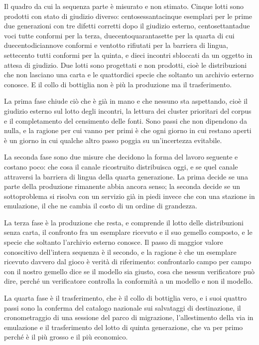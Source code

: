 Il quadro da cui la sequenza parte è misurato e non stimato. Cinque lotti sono prodotti con stato di giudizio diverso: centosessantacinque esemplari per le prime due generazioni con tre difetti corretti dopo il giudizio esterno, centosettantadue voci tutte conformi per la terza, duecentoquarantasette per la quarta di cui duecentodiciannove conformi e ventotto rifiutati per la barriera di lingua, settecento tutti conformi per la quinta, e dieci incontri sbloccati da un oggetto in attesa di giudizio. Due lotti sono progettati e non prodotti, cioè le distribuzioni che non lasciano una carta e le quattordici specie che soltanto un archivio esterno conosce. E il collo di bottiglia non è più la produzione ma il trasferimento.

La prima fase chiude ciò che è già in mano e che nessuno sta aspettando, cioè il giudizio esterno sul lotto degli incontri, la lettura dei cluster prioritari del corpus e il completamento del censimento delle fonti. Sono passi che non dipendono da nulla, e la ragione per cui vanno per primi è che ogni giorno in cui restano aperti è un giorno in cui qualche altro passo poggia su un'incertezza evitabile.

La seconda fase sono due misure che decidono la forma del lavoro seguente e costano poco: che cosa il canale ricostruito distribuisca oggi, e se quel canale attraversi la barriera di lingua della quarta generazione. La prima decide se una parte della produzione rimanente abbia ancora senso; la seconda decide se un sottoproblema si risolva con un servizio già in piedi invece che con una stazione in emulazione, il che ne cambia il costo di un ordine di grandezza.

La terza fase è la produzione che resta, e comprende il lotto delle distribuzioni senza carta, il confronto fra un esemplare ricevuto e il suo gemello composto, e le specie che soltanto l'archivio esterno conosce. Il passo di maggior valore conoscitivo dell'intera sequenza è il secondo, e la ragione è che un esemplare ricevuto davvero dal gioco è verità di riferimento: confrontarlo campo per campo con il nostro gemello dice se il modello sia giusto, cosa che nessun verificatore può dire, perché un verificatore controlla la conformità a un modello e non il modello.

La quarta fase è il trasferimento, che è il collo di bottiglia vero, e i suoi quattro passi sono la conferma del catalogo nazionale sui salvataggi di destinazione, il cronometraggio di una sessione del parco di migrazione, l'allestimento della via in emulazione e il trasferimento del lotto di quinta generazione, che va per primo perché è il più grosso e il più economico.

